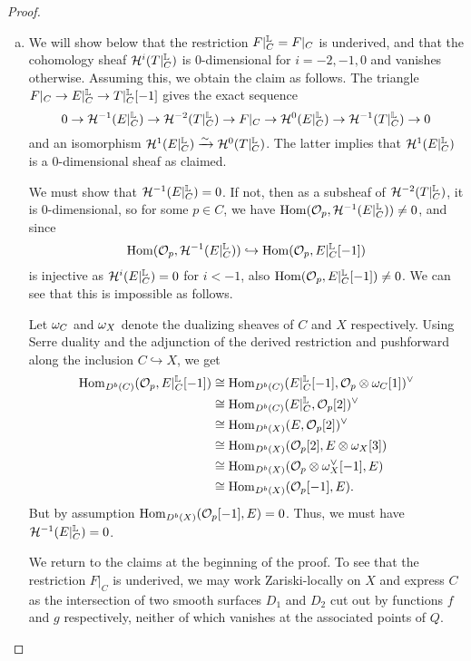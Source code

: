 \begin{proof}
    \begin{enumerate}[(a)]
    \item We will show below that the restriction $F|^{\mathbb{L}}_C = F|_C$ is underived, and that the cohomology sheaf $\mathcal{H}^i(T|^{\mathbb{L}}_C)$ is 0-dimensional for $i = -2, -1, 0$ and vanishes otherwise. Assuming this, we obtain the claim as follows. The triangle $F|_C \to E|^{\mathbb{L}}_C \to T|^{\mathbb{L}}_C[-1]$ gives the exact sequence
    \[ 0 \to \mathcal{H}^{-1}(E|^{\mathbb{L}}_C) \to \mathcal{H}^{-2}(T|^{\mathbb{L}}_C) \to F|_C \to \mathcal{H}^0(E|^{\mathbb{L}}_C) \to \mathcal{H}^{-1}(T|^{\mathbb{L}}_C) \to 0 \]
    and an isomorphism $\mathcal{H}^1(E|^{\mathbb{L}}_C) \xrightarrow{\sim} \mathcal{H}^0(T|^{\mathbb{L}}_C)$. The latter implies that $\mathcal{H}^1(E|^{\mathbb{L}}_C)$ is a 0-di\-men\-sion\-al sheaf as claimed. 
    
    We must show that $\mathcal{H}^{-1}(E|^{\mathbb{L}}_C) = 0$. If not, then as a subsheaf of $\mathcal{H}^{-2}(T|^{\mathbb{L}}_C)$, it is 0-dimensional, so for some $p \in C$, we have $\mathrm{Hom}(\mathcal{O}_p, \mathcal{H}^{-1}(E|^{\mathbb{L}}_C)) \neq 0$, and since
    \[ \mathrm{Hom}(\mathcal{O}_p, \mathcal{H}^{-1}(E|^{\mathbb{L}}_C)) \hookrightarrow \mathrm{Hom}(\mathcal{O}_p, E|^{\mathbb{L}}_C[-1]) \] 
    is injective as $\mathcal{H}^i(E|^{\mathbb{L}}_C) = 0$ for $i < -1$, also $\mathrm{Hom}(\mathcal{O}_p, E|^{\mathbb{L}}_C[-1]) \neq 0$. We can see that this is impossible as follows.
    
    Let $\omega_C$ and $\omega_X$ denote the dualizing sheaves of $C$ and $X$ respectively. Using Serre duality and the adjunction of the derived restriction and pushforward along the inclusion $C \hookrightarrow X$, we get
    \begin{align*}
        \mathrm{Hom}_{D^b(C)}(\mathcal{O}_p, E|^{\mathbb{L}}_C[-1]) & \cong \mathrm{Hom}_{D^b(C)}(E|^{\mathbb{L}}_C[-1], \mathcal{O}_p \otimes \omega_C [1])^\vee \\
        & \cong \mathrm{Hom}_{D^b(C)}(E|^{\mathbb{L}}_C, \mathcal{O}_p[2])^\vee \\
        & \cong \mathrm{Hom}_{D^b(X)}(E, \mathcal{O}_p[2])^\vee \\
        & \cong \mathrm{Hom}_{D^b(X)}(\mathcal{O}_p[2], E \otimes \omega_X[3]) \\
        & \cong \mathrm{Hom}_{D^b(X)}(\mathcal{O}_p \otimes \omega_X^\vee[-1], E) \\
        & \cong \mathrm{Hom}_{D^b(X)}(\mathcal{O}_p[-1], E).
    \end{align*}
    But by assumption $\mathrm{Hom}_{D^b(X)}(\mathcal{O}_p[-1], E) = 0$. Thus, we must have $\mathcal{H}^{-1}(E|^{\mathbb{L}}_C) = 0$.
    
    We return to the claims at the beginning of the proof. To see that the restriction $F|_C$ is underived, we may work Zariski-locally on $X$ and express $C$ as the intersection of two smooth surfaces $D_1$ and $D_2$ cut out by functions $f$ and $g$ respectively, neither of which vanishes at the associated points of $Q$. 
    

\end{enumerate}
\end{proof}
